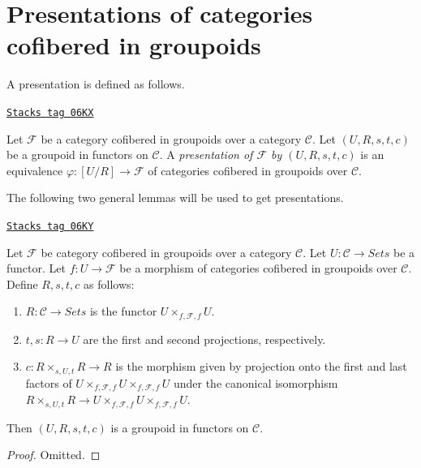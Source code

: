 \section{Presentations of categories cofibered in groupoids}
\label{formal-defos-section-presentation-categories-cofibred-in-groupoids}
A presentation is defined as follows.

\begin{definition}[Presentation]
\label{formal-defos-definition-presentation}
\href{https://stacks.math.columbia.edu/tag/06KX}{\texttt{Stacks tag 06KX}}

Let $\mathcal{F}$ be a category cofibered in groupoids over a category
$\mathcal{C}$. Let $(U, R, s, t, c)$ be a groupoid in functors on
$\mathcal{C}$. A
{\it presentation of $\mathcal{F}$ by $(U, R, s, t, c)$} is an equivalence
$\varphi : [U/R] \to \mathcal{F}$ of categories cofibered in groupoids
over $\mathcal{C}$.
\end{definition}

The following two general lemmas will be used to get presentations.

\begin{lemma}
\label{formal-defos-lemma-presentation-construction}
\href{https://stacks.math.columbia.edu/tag/06KY}{\texttt{Stacks tag 06KY}}

Let $\mathcal{F}$ be category cofibered in groupoids over a category
$\mathcal{C}$. Let $U : \mathcal{C} \to \textit{Sets}$ be a functor.
Let $f : U \to \mathcal{F}$ be a morphism of categories cofibered in groupoids
over $\mathcal{C}$. Define $R, s, t, c$ as follows:
\begin{enumerate}
\item $R : \mathcal{C} \to \textit{Sets}$ is the functor
$U \times_{f, \mathcal{F}, f} U$.
\item $t, s : R \to U$ are the first and second projections,
respectively.
\item $c : R \times_{s, U, t} R \to R$ is the morphism given by projection
onto the first and last factors of
$U \times_{f, \mathcal{F}, f} U \times_{f, \mathcal{F}, f} U$
under the canonical isomorphism
$R \times_{s, U, t} R \to
U \times_{f, \mathcal{F}, f} U \times_{f, \mathcal{F}, f} U$.
\end{enumerate}
Then $(U, R, s, t, c)$ is a groupoid in functors on $\mathcal{C}$.
\end{lemma}

\begin{proof}
Omitted.
\end{proof}


